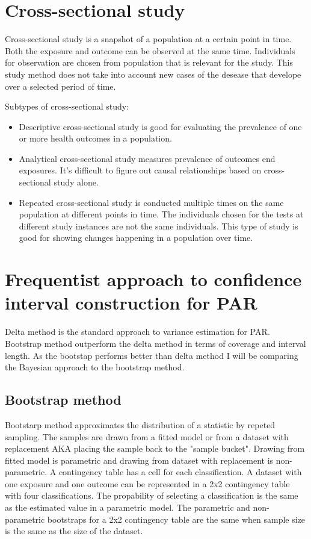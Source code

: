 \section{Cross-sectional study}\label{CrossSectionalStudy}
Cross-sectional study is a snapshot of a population at a certain point in time. Both the exposure and outcome can be observed at the same time. Individuals for observation are chosen from population that is relevant for the study. This study method does not take into account new cases of the desease that develope over a selected period of time. 

Subtypes of cross-sectional study:
\begin{itemize}
    \item Descriptive cross-sectional study is good for evaluating the prevalence of one or more health outcomes in a population.
    \item Analytical cross-sectional study measures prevalence of outcomes end exposures.  It's difficult to figure out causal relationships based on cross-sectional study alone. 
    \item Repeated cross-sectional study is conducted multiple times on the same population at different points in time. The individuals chosen for the tests at different study instances are not the same individuals. This type of study is good for showing changes happening in a population over time.
\end{itemize}
\cite{Wang2020CrossSectionalSS} 

\section{Frequentist approach to confidence interval construction for PAR}\label{FrequentistApproach}
Delta method is the standard approach to variance estimation for PAR. Bootstrap method outperform the delta method in terms of coverage and interval length. \cite{Pirikahu2016BayesianMO} As the bootstap performs better than delta method I will be comparing the Bayesian approach to the bootstrap method.

\subsection{Bootstrap method}\label{Bootstrap}
Bootstarp method approximates the distribution of a statistic by repeted sampling. The samples are drawn from a fitted model or from a dataset with replacement AKA placing the sample back to the "sample bucket". Drawing from fitted model is parametric and drawing from dataset with replacement is non-parametric. 
A contingency table has a cell for each classification. A dataset with one exposure and one outcome can be represented in a 2x2 contingency table with four classifications. The propability of selecting a classification is the same as the estimated value in a parametric model. The parametric and non-parametric bootstraps for a 2x2 contingency table are the same when sample size is the same as the size of the dataset.\cite{Pirikahu2016BayesianMO} 

